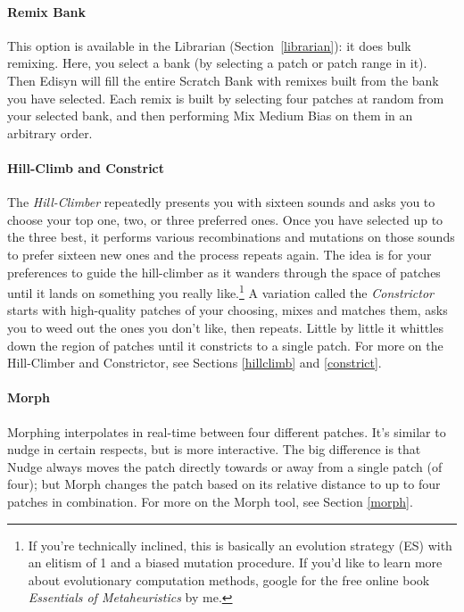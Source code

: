 \documentclass{article}
\begin{document}
\vspace{-0.5em}
\paragraph{Remix Bank}  This option is available in the Librarian (Section~\ref{librarian}): it does bulk remixing.  Here, you select a bank (by selecting a patch or patch range in it).  Then Edisyn will fill the entire Scratch Bank with remixes built from the bank you have selected.  Each remix is built by selecting four patches at random from your selected bank, and then performing Mix Medium Bias on them in an arbitrary order.

\paragraph{Hill-Climb and Constrict}  The {\it Hill-Climber} repeatedly presents you with sixteen sounds and asks you to choose your top one, two, or three preferred ones.  Once you have selected up to the three best, it performs various recombinations and mutations on those sounds to prefer sixteen new ones and the process repeats again.  The idea is for your preferences to guide the hill-climber as it wanders through the space of patches until it lands on something you really like.\footnote{If you're technically inclined, this is basically an evolution strategy (ES) with an elitism of 1 and a biased mutation procedure.  If you'd like to learn more about evolutionary computation methods, google for the free online book {\it Essentials of Metaheuristics} by me.}  A variation called the {\it Constrictor} starts with high-quality patches of your choosing, mixes and matches them, asks you to weed out the ones you don't like, then repeats.  Little by little it whittles down the region of patches until it constricts to a single patch. For more on the Hill-Climber and Constrictor, see Sections \ref{hillclimb} and \ref{constrict}.

\paragraph{Morph}  Morphing interpolates in real-time between four different patches.  It's similar to nudge in certain respects, but is more interactive.  The big difference is that Nudge always moves the patch directly towards or away from a single patch (of four); but Morph changes the patch based on its relative distance to up to four patches in combination.   For more on the Morph tool, see Section \ref{morph}.
\end{document}
